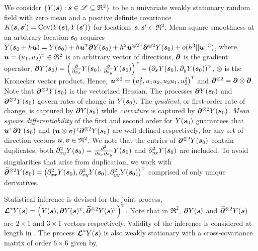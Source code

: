 We consider $\{Y(\bs): \bs\in\mathscr{S}\subseteq\mathfrak{R}^2\}$ to be a univariate weakly stationary random field with zero mean and a positive definite covariance $K(\bs, \bs')= \Cov(Y(\bs), Y(\bs'))$ for locations $\bs, \bs'\in \mathfrak{R}^2$. Mean square smoothness \citep[see, e.g.,][]{stein_interpolation_1999} at an arbitrary location $\bs_0$ requires $Y(\bs_0+h\bu) = Y(\bs_0)+h\bu^{\T}\bpartial Y(\bs_0) + h^2 {\bu^{\otimes 2}}^{\T}\bpartial^{\otimes 2}Y(\bs_0) + o(h^3||\bu||^3)$, where, $\bu=(u_1,u_2)^{\T}\in \mathfrak{R}^2$ is an arbitrary vector of directions, $\bpartial$ is the gradient operator, $\bpartial Y(\bs_0) = \left(\frac{\partial}{\partial s_x}Y(\bs_0),\frac{\partial}{\partial s_y}Y(\bs_0)\right)^{\T}=(\partial_xY(\bs_0), \partial_yY(\bs_0))^{\T}$, $\otimes$ is the Kronecker vector product. Hence, $\bu^{\otimes 2}= \left(u_1^2, u_1u_2, u_2u_1, u_2^2\right)^{\T}$ and $\bpartial^{\otimes 2} = \bpartial \otimes \bpartial$. Note that $\bpartial^{\otimes 2} Y(\bs_0)$ is the vectorized Hessian. The processes $\bpartial Y(\bs_0)$ and $\bpartial^{\otimes 2}Y(\bs_0)$ govern rates of change in $Y(\bs_0)$. The \emph{gradient}, or first-order rate of change, is captured by $\bpartial Y(\bs_0)$ while \emph{curvature} is captured by $\bpartial^{\otimes 2}Y(\bs_0)$. \emph{Mean square differentiability} \citep[see][]{banerjee_smoothness_2003} of the first and second order for $Y(\bs_0)$ guarantees that $\bu^{\T}\bpartial Y(\bs_0)$ and $(\bu\otimes\bv)^{\T}\bpartial^{\otimes 2}Y(\bs_0)$ are well-defined respectively, for any set of direction vectors $\bu, \bv\in \mathfrak{R}^2$. We note that the entries of $\bpartial^{\otimes 2}Y(\bs_0)$ contain duplicates, both $\partial^2_{xy}Y(\bs_0)=\frac{\partial^2}{\partial s_x\partial s_y}Y(\bs_0)$ and $\partial^2_{yx}Y(\bs_0)$ are included. To avoid singularities that arise from duplication, we work with $\widetilde{\bpartial}^{\otimes 2}Y(\bs_0)=\left(\partial_{xx}^2Y(\bs_0),\partial_{xy}^2Y(\bs_0), \partial_{yy}^2Y(\bs_0)\right)^{\T}$ comprised of only unique derivatives.

Statistical inference is devised for the joint process, $\L^*Y(\bs) = \left(Y(\bs), \bpartial Y(\bs)^{\T}, \widetilde{\bpartial}^{\otimes 2}Y(\bs)^{\T}\right)^{\T}$. { Note that in $\mathfrak{R}^2$, $\bpartial Y(\bs)$ and $\widetilde{\bpartial}^{\otimes 2}Y(\bs)$ are $2\times 1$ and $3\times 1$ vectors respectively.} Validity of the inference is considered at length in %
\cite{banerjee_directional_2003,halder2024bayesian}. The process $\L^*Y(\bs)$ is also weakly stationary with a cross-covariance matrix { of order $6\times 6$ given by}, 

